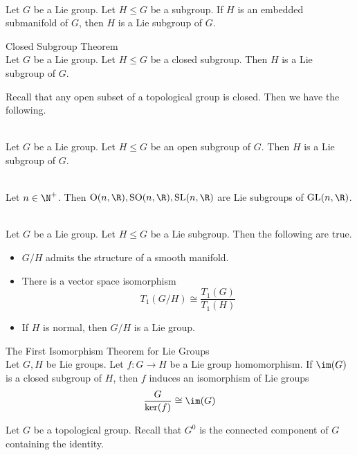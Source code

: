 \documentclass[a4paper]{article}
\begin{document}
\begin{prp}{}{}\\
Let $G$ be a Lie group. Let $H\leq G$ be a subgroup. If $H$ is an embedded submanifold of $G$, then $H$ is a Lie subgroup of $G$. 
\end{prp}

\begin{thm}{Closed Subgroup Theorem}{}\\
Let $G$ be a Lie group. Let $H\leq G$ be a closed subgroup. Then $H$ is a Lie subgroup of $G$. 
\end{thm}

Recall that any open subset of a topological group is closed. Then we have the following. 

\begin{crl}{}{}\\
Let $G$ be a Lie group. Let $H\leq G$ be an open subgroup of $G$. Then $H$ is a Lie subgroup of $G$. 
\end{crl}

\begin{eg}{}{}\\
Let $n\in\N^+$. Then $\text{O}(n,\R),\text{SO}(n,\R),\text{SL}(n,\R)$ are Lie subgroups of $\text{GL}(n,\R)$. 
\end{eg}

\begin{prp}{}{}\\
Let $G$ be a Lie group. Let $H\leq G$ be a Lie subgroup. Then the following are true. 
\begin{itemize}
\item $G/H$ admits the structure of a smooth manifold. 
\item There is a vector space isomorphism $$T_1(G/H)\cong\frac{T_1(G)}{T_1(H)}$$
\item If $H$ is normal, then $G/H$ is a Lie group. 
\end{itemize}
\end{prp}

\begin{thm}{The First Isomorphism Theorem for Lie Groups}{}\\
Let $G,H$ be Lie groups. Let $f:G\to H$ be a Lie group homomorphism. If $\im(G)$ is a closed subgroup of $H$, then $f$ induces an isomorphism of Lie groups $$\frac{G}{\ker(f)}\cong\im(G)$$
\end{thm}

Let $G$ be a topological group. Recall that $G^0$ is the connected component of $G$ containing the identity. 
\end{document}
